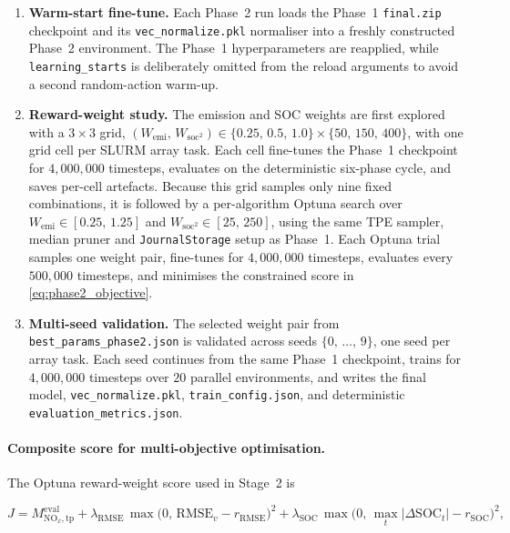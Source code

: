 \begin{enumerate}
  \item \textbf{Warm-start fine-tune.} Each Phase~2 run loads the Phase~1 \texttt{final.zip} checkpoint and its \texttt{vec\_normalize.pkl} normaliser into a freshly constructed Phase~2 environment. The Phase~1 hyperparameters are reapplied, while \texttt{learning\_starts} is deliberately omitted from the reload arguments to avoid a second random-action warm-up.
  \item \textbf{Reward-weight study.} The emission and \ac{SOC} weights are first explored with a $3\!\times\!3$ grid, $(W_{\text{emi}},\,W_{\text{soc}^2}) \in \{0.25,\,0.5,\,1.0\}\times\{50,\,150,\,400\}$, with one grid cell per SLURM array task. Each cell fine-tunes the Phase~1 checkpoint for $4{,}000{,}000$ timesteps, evaluates on the deterministic six-phase cycle, and saves per-cell artefacts. Because this grid samples only nine fixed combinations, it is followed by a per-algorithm Optuna search over $W_{\text{emi}} \in [0.25,\,1.25]$ and $W_{\text{soc}^2} \in [25,\,250]$, using the same \ac{TPE} sampler, median pruner and \texttt{JournalStorage} setup as Phase~1. Each Optuna trial samples one weight pair, fine-tunes for $4{,}000{,}000$ timesteps, evaluates every $500{,}000$ timesteps, and minimises the constrained score in \autoref{eq:phase2_objective}.
  \item \textbf{Multi-seed validation.} The selected weight pair from \texttt{best\_params\_phase2.json} is validated across seeds $\{0,\,\dots,\,9\}$, one seed per array task. Each seed continues from the same Phase~1 checkpoint, trains for $4{,}000{,}000$ timesteps over $20$ parallel environments, and writes the final model, \texttt{vec\_normalize.pkl}, \texttt{train\_config.json}, and deterministic \linebreak\texttt{evaluation\_metrics.json}.
\end{enumerate}

\paragraph{Composite score for multi-objective optimisation.}
The Optuna reward-weight score used in Stage~2 is

\begin{equation}
  J = M_{\mathrm{NO}_{x},\mathrm{tp}}^{\mathrm{eval}}
  + \lambda_{\text{RMSE}}\,\max\!\bigl(0,\,\mathrm{RMSE}_v - r_{\text{RMSE}}\bigr)^{2}
  + \lambda_{\text{SOC}}\,\max\!\bigl(0,\,\max_t|\Delta\mathrm{SOC}_t| - r_{\text{SOC}}\bigr)^{2},
  \label{eq:phase2_objective}
\end{equation}

